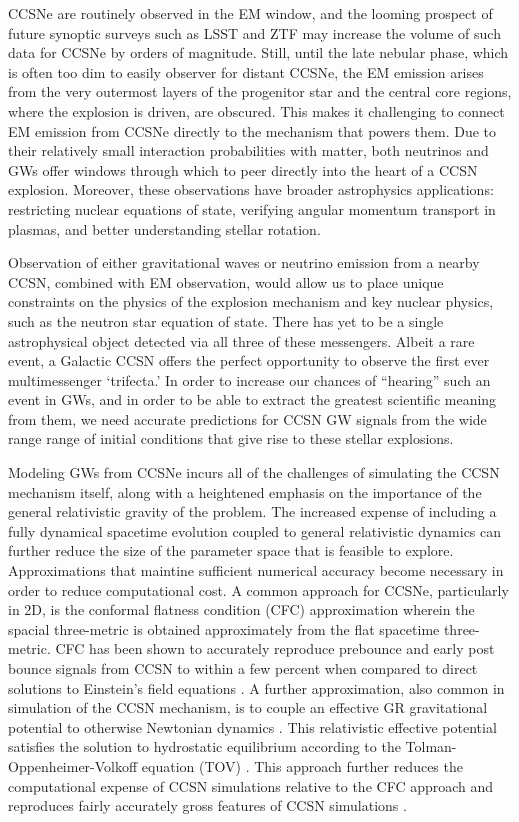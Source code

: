 \documentclass[twocolumn,times]{aastex62}  %
\begin{document}
CCSNe are routinely observed in the EM window, and the looming prospect of future synoptic surveys such as LSST and ZTF may increase the volume of such data for CCSNe by orders of magnitude.
Still, until the late nebular phase, which is often too dim to easily observer for distant CCSNe, the EM emission arises from the very outermost layers of the progenitor star and the central core regions, where the explosion is driven, are obscured. 
This makes it challenging to connect EM emission from CCSNe directly to the mechanism that powers them.
Due to their relatively small interaction probabilities with matter, both neutrinos and GWs offer windows through which to peer directly into the heart of a CCSN explosion.  
Moreover, these observations have broader astrophysics applications: restricting nuclear equations of state, verifying angular momentum transport in plasmas, and better understanding stellar rotation.

Observation of either gravitational waves or neutrino emission from a nearby CCSN, combined with EM observation, would allow us to place unique constraints on the physics of the explosion mechanism and key nuclear physics, such as the neutron star equation of state.  
There has yet to be a single astrophysical object detected via all three of these messengers.  
Albeit a rare event, a Galactic CCSN offers the perfect opportunity to observe the first ever multimessenger `trifecta.'  
In order to increase our chances of ``hearing'' such an event in GWs, and in order to be able to extract the greatest scientific meaning from them, we need accurate predictions for CCSN GW signals from the wide range range of initial conditions that give rise to these stellar explosions.

Modeling GWs from CCSNe incurs all of the challenges of simulating the CCSN mechanism itself, along with a heightened emphasis on the importance of the general relativistic gravity of the problem. 
The increased expense of including a fully dynamical spacetime evolution coupled to general relativistic dynamics \citep[cf.][]{ott:2009, ott:2012} can further reduce the size of the parameter space that is feasible to explore. 
Approximations that maintine sufficient numerical accuracy become necessary in order to reduce computational cost.  
A common approach for CCSNe, particularly in 2D, is the conformal flatness condition (CFC) approximation wherein the spacial three-metric is obtained approximately from the flat spacetime three-metric.
CFC has been shown to accurately reproduce prebounce and early post bounce signals from CCSN to within a few percent when compared to direct solutions to Einstein's field equations  \citep{ott:2007}.
A further approximation, also common in simulation of the CCSN mechanism, is to couple an effective GR gravitational potential to otherwise Newtonian dynamics \citep{rampp:2002, marek:2006, bruenn:2016, oconnor:2018, morozova:2018}.  
This relativistic effective potential satisfies the solution to hydrostatic equilibrium according to the Tolman-Oppenheimer-Volkoff equation (TOV) \citep{rampp:2002, marek:2006}.
This approach further reduces the computational expense of CCSN simulations relative to the CFC approach and reproduces fairly accurately gross features of CCSN simulations \citep{marek:2006, muller:2012}. 
\end{document}
